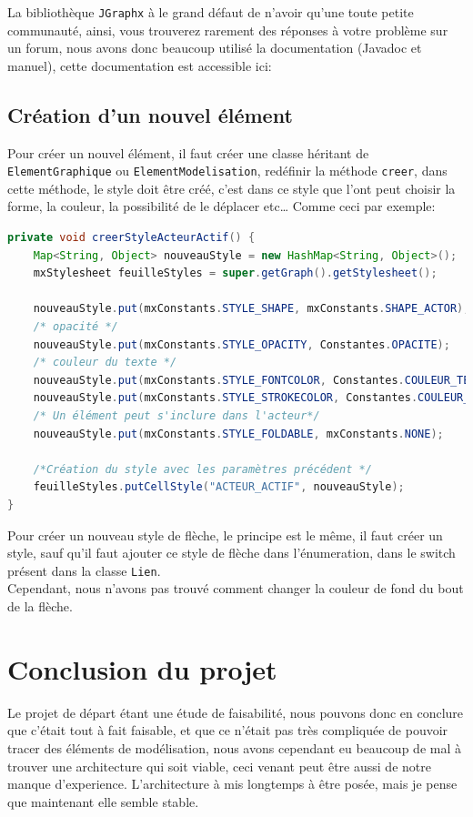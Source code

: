\documentclass[12pt,a4paper,oneside]{book}
\begin{document}
	La bibliothèque \texttt{JGraphx} à le grand défaut de n'avoir qu'une toute petite communauté, ainsi, vous trouverez rarement des réponses à votre problème
	sur un forum, nous avons donc beaucoup utilisé la documentation (Javadoc et manuel), cette documentation est accessible ici: 
	\section{Création d'un nouvel élément}
	Pour créer un nouvel élément, il faut créer une classe héritant de \texttt{ElementGraphique} ou \texttt{ElementModelisation}, redéfinir la méthode \texttt{creer}, dans cette méthode, le style doit être créé, c'est dans ce style que l'ont peut choisir la forme, la couleur, la possibilité de le déplacer etc\ldots 
	Comme ceci par exemple:
	\begin{lstlisting}[language=Java, caption=Création du style de l'acteur actif]
private void creerStyleActeurActif() {
	Map<String, Object> nouveauStyle = new HashMap<String, Object>();
	mxStylesheet feuilleStyles = super.getGraph().getStylesheet();
	
	nouveauStyle.put(mxConstants.STYLE_SHAPE, mxConstants.SHAPE_ACTOR); 
	/* opacité */
	nouveauStyle.put(mxConstants.STYLE_OPACITY, Constantes.OPACITE);
	/* couleur du texte */
	nouveauStyle.put(mxConstants.STYLE_FONTCOLOR, Constantes.COULEUR_TEXTE); 
	nouveauStyle.put(mxConstants.STYLE_STROKECOLOR, Constantes.COULEUR_BORDURE); //Couleur de la bordure
	/* Un élément peut s'inclure dans l'acteur*/
	nouveauStyle.put(mxConstants.STYLE_FOLDABLE, mxConstants.NONE); 
	
	/*Création du style avec les paramètres précédent */
	feuilleStyles.putCellStyle("ACTEUR_ACTIF", nouveauStyle); 
}
\end{lstlisting}
Pour créer un nouveau style de flèche, le principe est le même, il faut créer un style, sauf qu'il faut ajouter ce style de flèche dans l'énumeration, dans
le switch présent dans la classe \texttt{Lien}.\\
Cependant, nous n'avons pas trouvé comment changer la couleur de fond du bout de la flèche.
	
	\chapter{Conclusion du projet}
	\nouveauChapitre
	Le projet de départ étant une étude de faisabilité, nous pouvons donc en conclure que c'était tout à fait faisable, et que ce n'était pas très compliquée de pouvoir
	tracer des éléments de modélisation, nous avons cependant eu beaucoup de mal à trouver une architecture qui soit viable, ceci venant peut être aussi de notre manque
	d'experience. L'architecture à mis longtemps à être posée, mais je pense que maintenant elle semble stable.
\end{document}

